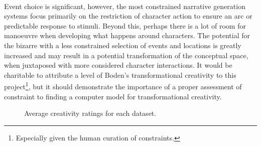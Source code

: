 \documentclass[letterpaper]{article}
\begin{document}
\\Event choice is significant, however, the most constrained narrative generation systems focus primarily on the restriction of character action to ensure an arc or predictable response to stimuli. Beyond this, perhaps there is a lot of room for manoeuvre when developing what happens around characters. The potential for the bizarre with a less constrained selection of events and locations is greatly increased and may result in a potential transformation of the conceptual space, when juxtaposed with more considered character interactions. It would be charitable to attribute a level of Boden's transformational creativity to this project\footnote{Especially given the human curation of constraints.}, but it should demonstrate the importance of a proper assessment of constraint to finding a computer model for transformational creativity.
\begin{figure}[h!]
\centering
{}
\caption[Average Creativity by Dataset]{Average creativity ratings for each dataset.}
\label{fig:acr}
\end{figure}
\end{document}
